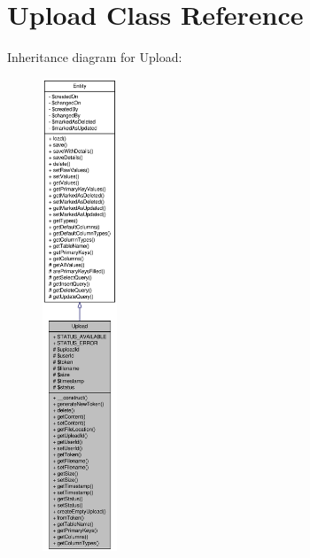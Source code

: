 \hypertarget{classUpload}{
\section{Upload Class Reference}
\label{classUpload}
}


Inheritance diagram for Upload:\nopagebreak
\begin{figure}[H]
\begin{center}
\leavevmode
\includegraphics[height=400pt]{classUpload__inherit__graph}
\end{center}
\end{figure}



